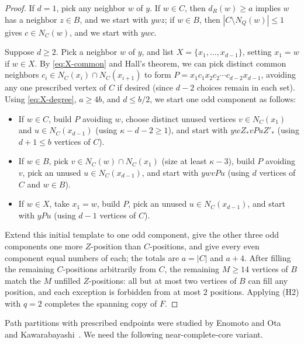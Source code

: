 \documentclass[10pt]{article}
\theoremstyle{compactplain}
\theoremstyle{remark}\newtheorem{remark}[theorem]{Remark}
\begin{document}
\begin{proof}
If $d=1$, pick any neighbor $w$ of $y$. If $w\in C$, then
$d_R(w)\ge a$ implies $w$ has a neighbor $z\in B$, and we start with
$ywz$; if $w\in B$, then $|C\setminus N_Q(w)|\le1$ gives $c\in N_C(w)$,
and we start with $ywc$.

Suppose $d\ge2$. Pick a neighbor $w$ of $y$, and list
$X=\{x_1,\ldots,x_{d-1}\}$, setting $x_1=w$ if $w\in X$. By
\eqref{eq:X-common} and Hall's theorem, we can pick distinct common
neighbors $c_i\in N_C(x_i)\cap N_C(x_{i+1})$ to form
$P=x_1c_1x_2c_2\cdots c_{d-2}x_{d-1}$, avoiding any one prescribed vertex
of $C$ if desired (since $d-2$ choices remain in each set). Using
\eqref{eq:X-degree}, $a\ge4b$, and $d\le b/2$, we start one odd
component as follows:
\begin{itemize}
\item If $w\in C$, build $P$ avoiding $w$, choose distinct unused
vertices $v\in N_C(x_1)$ and $u\in N_C(x_{d-1})$ (using
$\kappa-d-2\ge1$), and start with $ywZ_\ast vPuZ'_\ast$ (using
$d+1\le b$ vertices of $C$).
\item If $w\in B$, pick $v\in N_C(w)\cap N_C(x_1)$ (size at least
$\kappa-3$), build $P$ avoiding $v$, pick an unused $u\in N_C(x_{d-1})$,
and start with $ywvPu$ (using $d$ vertices of $C$ and $w\in B$).
\item If $w\in X$, take $x_1=w$, build $P$, pick an unused
$u\in N_C(x_{d-1})$, and start with $yPu$ (using $d-1$ vertices of
$C$).
\end{itemize}
Extend this initial template to one odd component, give the other three
odd components one more $Z$-position than $C$-positions, and give every
even component equal numbers of each; the totals are $a=|C|$ and $a+4$.
After filling the remaining $C$-positions arbitrarily from $C$, the
remaining $M\ge14$ vertices of $B$ match the $M$ unfilled $Z$-positions:
all but at most two vertices of $B$ can fill any position, and each
exception is forbidden from at most $2$ positions. Applying (H2) with
$q=2$ completes the spanning copy of $F$.
\end{proof}

Path partitions with prescribed endpoints were studied by Enomoto and
Ota~\cite{EnomotoOta} and Kawarabayashi~\cite{Kawarabayashi}. We need
the following near-complete-core variant.
\end{document}
